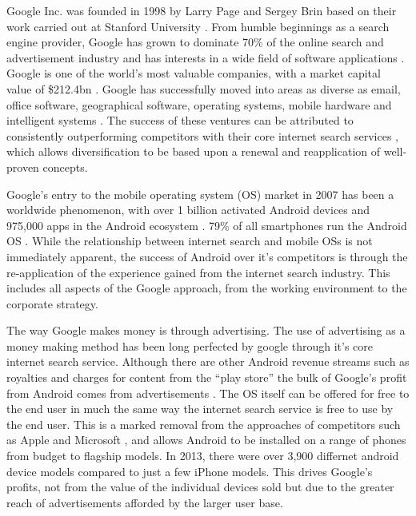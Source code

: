
Google Inc. was founded in 1998 \cite{google:timeline} by Larry Page and Sergey Brin based on their work carried out at Stanford University \cite{brin1998anatomy}. From humble beginnings as a search engine provider, Google has grown to dominate 70\% of the online search and advertisement industry \cite{rothrmel2013strategic} and has interests in a wide field of software applications \cite{wheelen2012strategic}. Google is one of the world's most valuable companies, with a market capital value of \$212.4bn \cite{FT500}. Google has successfully moved into areas as diverse as email, office software, geographical software, operating systems, mobile hardware and intelligent systems \cite{rothrmel2013strategic, wheelen2012strategic}. The success of these ventures can be attributed to consistently outperforming competitors with their core internet search services \cite{wheelen2012strategic}, which allows diversification to be based upon a renewal and reapplication of well-proven concepts.

Google's entry to the mobile operating system (OS) market in 2007 has been a worldwide phenomenon, with over 1 billion activated Android devices and 975,000 apps in the Android ecosystem \cite{google:timeline}. 79\% of all smartphones run the Android OS \cite{krajci2013android}. While the relationship between internet search and mobile OSs is not immediately apparent, the success of Android over it's competitors is through the re-application of the experience gained from the internet search industry. This includes all aspects of the Google approach, from the working environment to the corporate strategy. 

The way Google makes money is through advertising. The use of advertising as a money making method has been long perfected by google through it's core internet search service. Although there are other Android revenue streams such as royalties and charges for content from the ``play store'' the bulk of Google's profit from Android comes from advertisements \cite{krajci2013android}. The OS itself can be offered for free to the end user in much the same way the internet search service is free to use by the end user. This is a marked removal from the approaches of competitors such as Apple and Microsoft \cite{rothrmel2013strategic}, and allows Android to be installed on a range of phones from budget to flagship models. In 2013, there were over 3,900 differnet android device models \cite{krajci2013android} compared to just a few iPhone models. This drives Google's profits, not from the value of the individual devices sold but due to the greater reach of advertisements afforded by the larger user base.  

